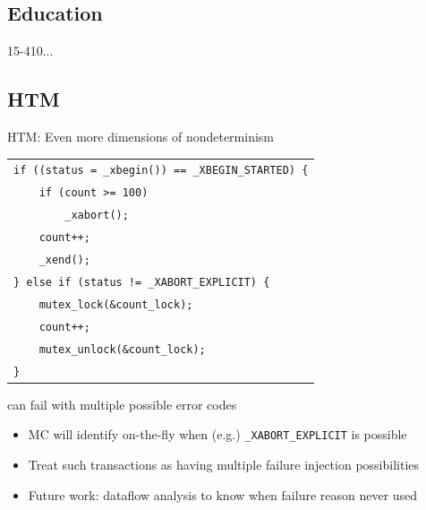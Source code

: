 \documentclass[xcolor=dvipsnames]{beamer}
\begin{document}
\subsection{Education}

\begin{frame}{15-410...}
\end{frame}

\subsection{HTM}

\begin{frame}{HTM: Even more dimensions of nondeterminism}
	\begin{center}
		\begin{tabular}{l}
			\texttt{if ((status = \_xbegin()) == \_XBEGIN\_STARTED) \{} \\
			\texttt{~~~~if (count >= 100)}\\
			\texttt{~~~~~~~~\_xabort();} \\
			\texttt{~~~~count++;} \\
			\texttt{~~~~\_xend();} \\
			\texttt{\} else if (status != \_XABORT\_EXPLICIT) \{} \\
			\texttt{~~~~mutex\_lock(\&count\_lock);} \\
			\texttt{~~~~count++;} \\
			\texttt{~~~~mutex\_unlock(\&count\_lock);} \\
			\texttt{\}} \\
		\end{tabular}
	\end{center}
	\linegap

	\xbegin can fail with multiple possible error codes
	\begin{itemize}
		\item MC will identify on-the-fly when (e.g.) {\tt \_XABORT\_EXPLICIT} is possible
		\item Treat such transactions as having multiple failure injection possibilities
		\item Future work: dataflow analysis to know when failure reason never used
	\end{itemize}
\end{frame}
\end{document}
